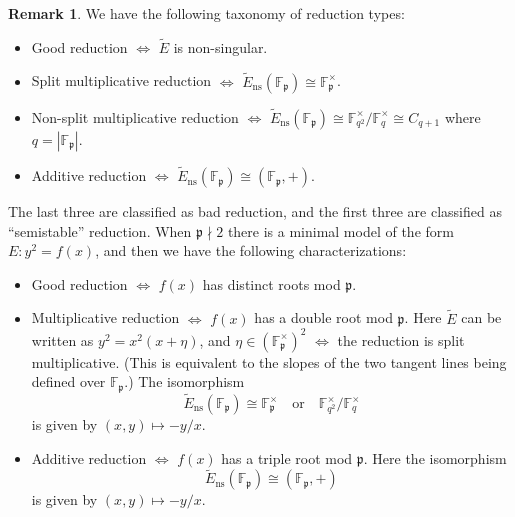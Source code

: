 \documentclass[a4paper]{article}
\theoremstyle{definition}
\newtheorem*{remark}{Remark}
\newcommand{\ns}{\mathrm{ns}}
\newcommand{\p}{\mathfrak{p}}
\newcommand{\F}{\mathbb{F}}
\begin{document}
\begin{remark}
    We have the following taxonomy of reduction types:
    \begin{itemize}
        \item Good reduction
            $\iff$ $\tilde E$ is non-singular.
        \item Split multiplicative reduction
            $\iff$ $\tilde E_\ns(\F_\p)\cong\F_\p^\times$.
        \item Non-split multiplicative reduction
            $\iff$
            $\tilde E_\ns(\F_\p)\cong\F_{q^2}^\times/\F_q^\times\cong C_{q+1}$
            where $q=|\F_\p|$.
        \item Additive reduction
            $\iff$ $\tilde E_\ns(\F_\p)\cong(\F_\p,+)$.
    \end{itemize}
    The last three are classified as bad reduction, and the first three are
    classified as ``semistable'' reduction. When $\p\nmid2$ there is a minimal
    model of the form $E:y^2=f(x)$, and then we have the following
    characterizations:
    \begin{itemize}
        \item Good reduction $\iff$ $f(x)$ has distinct roots mod $\p$.
        \item Multiplicative reduction $\iff$ $f(x)$ has a double root mod $\p$.
            Here $\tilde E$ can be written as $y^2=x^2(x+\eta)$, and
            $\eta\in(\F_\p^\times)^2$ $\iff$ the reduction is split
            multiplicative. (This is equivalent to the slopes of the two tangent
            lines being defined over $\F_\p$.) The isomorphism
            \begin{equation*}
                \tilde E_\ns(\F_\p)\cong\F_\p^\times
                    \quad\text{or}\quad\F_{q^2}^\times/\F_q^\times
            \end{equation*}
            is given by $(x,y)\mapsto-y/x$.
        \item Additive reduction $\iff$ $f(x)$ has a triple root mod $\p$. Here
            the isomorphism
            \begin{equation*}
                \tilde E_\ns(\F_\p)\cong(\F_\p,+)
            \end{equation*}
            is given by $(x,y)\mapsto-y/x$.
    \end{itemize}
\end{remark}
\end{document}
